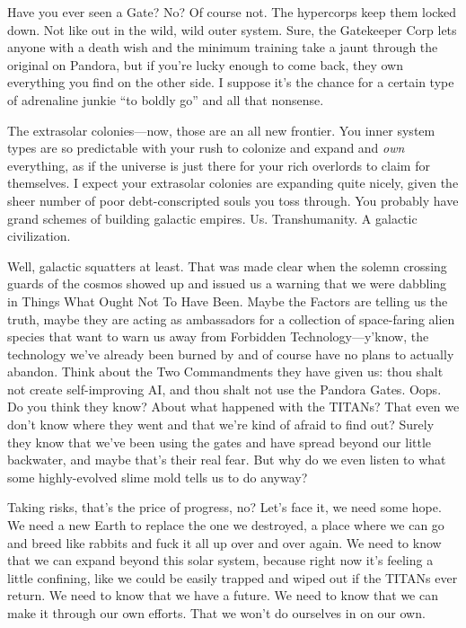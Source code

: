 Have you ever seen a Gate? No? Of course not. 
The hypercorps keep them locked down. Not like out 
in the wild, wild outer system. Sure, the Gatekeeper 
Corp lets anyone with a death wish and the minimum 
training take a jaunt through the original on Pandora, 
but if you're lucky enough to come back, they own 
everything you find on the other side. I suppose it's 
the chance for a certain type of adrenaline junkie ``to 
boldly go'' and all that nonsense.

The extrasolar colonies—now, those are an all new 
frontier. You inner system types are so predictable 
with your rush to colonize and expand and \textit{own}
everything, as if the universe is just there for your 
rich overlords to claim for themselves. I expect your 
extrasolar colonies are expanding quite nicely, given 
the sheer number of poor debt-conscripted souls you 
toss through. You probably have grand schemes of 
building galactic empires. Us. Transhumanity. A galactic
civilization.

Well, galactic squatters at least. That was made 
clear when the solemn crossing guards of the cosmos 
showed up and issued us a warning that we were 
dabbling in Things What Ought Not To Have Been. 
Maybe the Factors are telling us the truth, maybe they 
are acting as ambassadors for a collection of space-faring
alien species that want to warn us away from
Forbidden Technology—y'know, the technology we've 
already been burned by and of course have no plans 
to actually abandon. Think about the Two Commandments
they have given us: thou shalt not create
self-improving AI, and thou shalt not use the Pandora 
Gates. Oops. Do you think they know? About what 
happened with the TITANs? That even we don't know 
where they went and that we're kind of afraid to find 
out? Surely they know that we've been using the gates 
and have spread beyond our little backwater, and 
maybe that's their real fear. But why do we even listen 
to what some highly-evolved slime mold tells us to 
do anyway?

Taking risks, that's the price of progress, no? Let's 
face it, we need some hope. We need a new Earth to 
replace the one we destroyed, a place where we can go 
and breed like rabbits and fuck it all up over and over 
again. We need to know that we can expand beyond 
this solar system, because right now it's feeling a little 
confining, like we could be easily trapped and wiped 
out if the TITANs ever return. We need to know that 
we have a future. We need to know that we can make 
it through our own efforts. That we won't do ourselves
in on our own.

